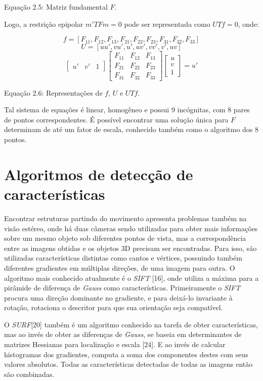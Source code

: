 Equação 2.5: Matriz fundamental $F$.

Logo, a restrição epipolar $m'TFm = 0$ pode ser representada como $UTf = 0$, onde:

$$
f = [F_{11}, F_{12}, F_{13}, F_{21}, F_{22}, F_{23}, F_{31}, F_{32}, F_{33}]
$$
$$
U = [uu', vu', u', uv', vv', v', uv]
$$
$$
\begin{bmatrix}u' & v' & 1\end{bmatrix} 
\begin{bmatrix}
	F_{11} &  F_{12} &  F_{13}\\
	F_{21} &  F_{22} &  F_{23}\\
	F_{31} &  F_{32} &  F_{33}
\end{bmatrix}
\begin{bmatrix}u\\v\\1\end{bmatrix} = u'
$$

Equação 2.6: Representações de $f$, $U$ e $UTf$.

Tal sistema de equações é linear, homogêneo e possui 9 incógnitas, com 8 pares de pontos correspondentes. É possível encontrar uma solução única para $F$ determinam de até um fator de escala, conhecido também como o algoritmo dos 8 pontos.


\section{Algoritmos de detecção de características}

Encontrar estruturas partindo do movimento apresenta problemas também na visão estéreo, onde há duas câmeras sendo utilizadas para obter mais informações sobre um mesmo objeto sob diferentes pontos de vista, mas a correspondência entre as imagens obtidas e os objetos 3D precisam ser encontradas. Para isso, são utilizadas características distintas como cantos e vértices, possuindo também diferentes gradientes em múltiplas direções, de uma imagem para outra. O algoritmo mais conhecido atualmente é o \textit{SIFT} [16], onde utiliza a máxima para a pirâmide de diferença de \textit{Gauss} como características. Primeiramente o \textit{SIFT} procura uma direção dominante no gradiente, e para deixá-lo invariante à rotação, rotaciona o descritor para que sua orientação seja compatível.

O \textit{SURF}[20] também é um algoritmo conhecido na tarefa de obter características, mas ao invés de obter as diferenças de \textit{Gauss}, se baseia em determinantes de matrizes Hessianas para localização e escala [24]. E ao invés de calcular histogramas dos gradientes, computa a soma dos componentes destes com seus valores absolutos. Todas as características detectadas de todas as imagens então são combinadas.

